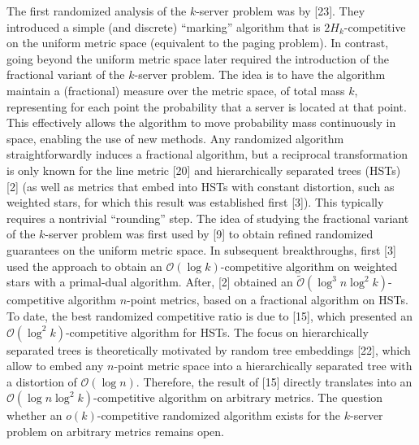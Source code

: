 The first randomized analysis of the $k$-server problem was by [23]. They introduced a simple (and discrete) “marking” algorithm that is $2H_{k}$-competitive on the uniform metric space (equivalent to the paging problem). In contrast, going beyond the uniform metric space later required the introduction of the fractional variant of the $k$-server problem. The idea is to have the algorithm maintain a (fractional) measure over the metric space, of total mass $k$, representing for each point the probability that a server is located at that point. This effectively allows the algorithm to move probability mass continuously in space, enabling the use of new methods. Any randomized algorithm straightforwardly induces a fractional algorithm, but a reciprocal transformation is only known for the line metric [20] and hierarchically separated trees (HSTs) [2] (as well as metrics that embed into HSTs with constant distortion, such as weighted stars, for which this result was established first [3]). This typically requires a nontrivial “rounding” step.
The idea of studying the fractional variant of the $k$-server problem was first used by [9] to obtain refined randomized guarantees on the uniform metric space.
In subsequent breakthroughs, first [3] used the approach to obtain an $\mathcal{O}(\log k)$-competitive algorithm on weighted stars with a primal-dual algorithm. After, [2] obtained an $\tilde{\mathcal{O}}(\log^{3}n\log^{2}k)$-competitive algorithm $n$-point metrics, based on a fractional algorithm on HSTs. To date, the best randomized competitive ratio is due to [15], which presented an $\mathcal{O}(\log^{2}k)$-competitive algorithm for HSTs. The focus on hierarchically separated trees is theoretically motivated by random tree embeddings [22], which allow to embed any $n$-point metric space into a hierarchically separated tree with a distortion of $\mathcal{O}(\log n)$. Therefore, the result of [15] directly translates into an $\mathcal{O}(\log n\log^{2}k)$-competitive algorithm on arbitrary metrics. The question whether an $o(k)$-competitive randomized algorithm exists for the $k$-server problem on arbitrary metrics remains open.\par




